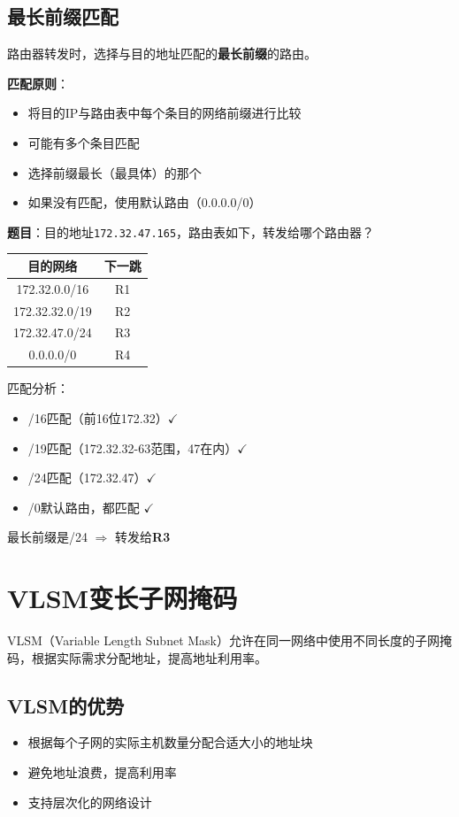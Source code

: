 \documentclass[12pt,a4paper,openany]{ctexbook}
\begin{document}
\subsection{最长前缀匹配}
路由器转发时，选择与目的地址匹配的\textbf{最长前缀}的路由。

\textbf{匹配原则}：
\begin{itemize}[leftmargin=2em,itemsep=0pt]
    \item 将目的IP与路由表中每个条目的网络前缀进行比较
    \item 可能有多个条目匹配
    \item 选择前缀最长（最具体）的那个
    \item 如果没有匹配，使用默认路由（0.0.0.0/0）
\end{itemize}

\begin{examplebox}[例题4.2 最长前缀匹配]
\textbf{题目}：目的地址\texttt{172.32.47.165}，路由表如下，转发给哪个路由器？
\begin{center}\small
\begin{tabular}{|c|c|}
\hline
目的网络 & 下一跳 \\
\hline
172.32.0.0/16 & R1 \\
172.32.32.0/19 & R2 \\
172.32.47.0/24 & R3 \\
0.0.0.0/0 & R4 \\
\hline
\end{tabular}
\end{center}
\tcblower
匹配分析：
\begin{itemize}[itemsep=0pt]
    \item /16匹配（前16位172.32）$\checkmark$
    \item /19匹配（172.32.32-63范围，47在内）$\checkmark$
    \item /24匹配（172.32.47）$\checkmark$
    \item /0默认路由，都匹配 $\checkmark$
\end{itemize}
最长前缀是/24 $\Rightarrow$ 转发给\textbf{R3}
\end{examplebox}

\section{VLSM变长子网掩码}
VLSM（Variable Length Subnet Mask）允许在同一网络中使用不同长度的子网掩码，根据实际需求分配地址，提高地址利用率。

\subsection{VLSM的优势}
\begin{itemize}[leftmargin=2em,itemsep=0pt]
    \item 根据每个子网的实际主机数量分配合适大小的地址块
    \item 避免地址浪费，提高利用率
    \item 支持层次化的网络设计
\end{itemize}
\end{document}
